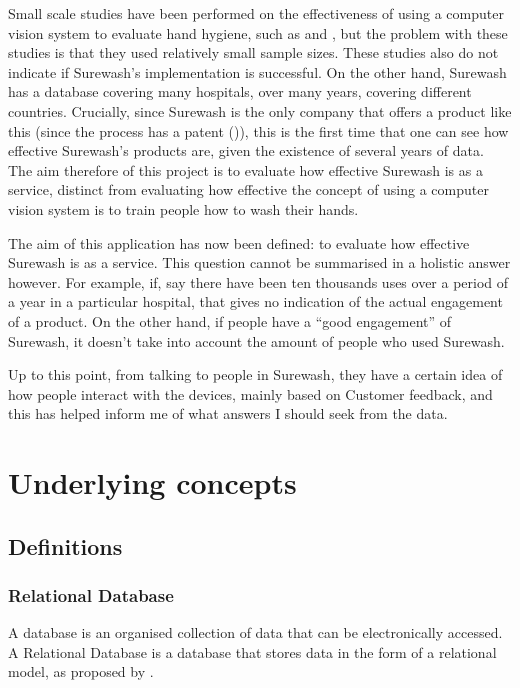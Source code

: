 Small scale studies have been performed on the effectiveness of using a computer vision system to evaluate hand hygiene, such as \cite{ghosh2011impact} and \cite{ghosh2013pilot}, but the problem with these studies is that they used relatively small sample sizes. These studies also do not indicate if Surewash's implementation is successful. On the other hand, Surewash has a database covering many hospitals, over many years, covering different countries. Crucially, since Surewash is the only company that offers a product like this (since the process has a patent (\cite{handwashpatentglanta})), this is the first time that one can see how effective Surewash's products are, given the existence of several years of data. The aim therefore of this project is to evaluate how effective Surewash is as a service, distinct from evaluating how effective the concept of using a computer vision system is to train people how to wash their hands.

The aim of this application has now been defined: to evaluate how effective Surewash is as a service. This question cannot be summarised in a holistic answer however. For example, if, say there have been ten thousands uses over a period of a year in a particular hospital, that gives no indication of the actual engagement of a product. On the other hand, if people have a ``good engagement'' of Surewash, it doesn't take into account the amount of people who used Surewash.

Up to this point, from talking to people in Surewash, they have a certain idea of how people interact with the devices, mainly based on Customer feedback, and this has helped inform me of what answers I should seek from the data.


\section{Underlying concepts}
    \subsection{Definitions}
        \subsubsection{Relational Database}
        A database is an organised collection of data that can be electronically accessed. A Relational Database is a database that stores data in the form of a relational model, as proposed by \cite{Codd}.

